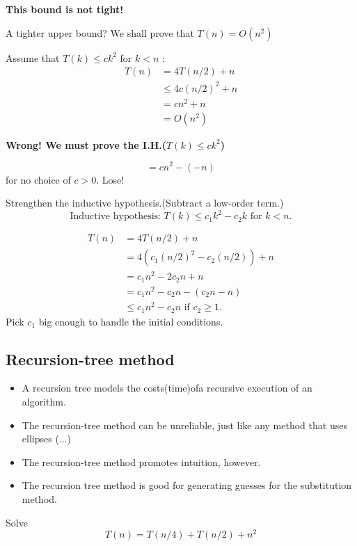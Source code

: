\documentclass[11pt]{elegantbook}
\begin{document}
\begin{center}
\textbf{This bound is not tight!}
\end{center}
\begin{note}
  A tighter upper bound? We shall prove that $T(n)=O\left(n^{2}\right)$
\end{note}
Assume that $T(k) \leq c k^{2}$ for $k<n$ :
$$
\begin{aligned}
T(n) &=4 T(n / 2)+n \\
& \leq 4 c(n / 2)^{2}+n \\
&=c n^{2}+n \\
&=O\left(n^{2}\right)
\end{aligned}
$$
\begin{center}
  \textbf{Wrong! We must prove the I.H.($T(k) \leq ck^2$)}
\end{center}
$$
=c n^{2}-(-n)
$$
for no choice of $c>0$. Lose!
\begin{note}
   Strengthen the inductive hypothesis.(Subtract a low-order term.)
  $$
\text { Inductive hypothesis: } T(k) \leq c_{1} k^{2}-c_{2} k \text { for } k<n \text {. }
$$
\end{note}
\begin{solution}
  $$
  \begin{aligned}
  T(n) &=4 T(n / 2)+n \\
  &=4\left(c_{1}(n / 2)^{2}-c_{2}(n / 2)\right)+n \\
  &=c_{1} n^{2}-2 c_{2} n+n \\
  &=c_{1} n^{2}-c_{2} n-\left(c_{2} n-n\right) \\
  & \leq c_{1} n^{2}-c_{2} n \text { if } c_{2} \geq 1 .
  \end{aligned}
  $$
Pick $c_1$ big enough to handle the initial conditions.
\end{solution}
\subsection{Recursion-tree method}
\begin{itemize}
  \item A recursion tree models the costs(time)ofa recursive execution of an algorithm.

  \item The recursion-tree method can be unreliable, just like any method that uses ellipses (...) 
  
  \item The recursion-tree method promotes intuition, however.
  \item The recursion tree method is good for generating guesses for the substitution method.
\end{itemize}
\begin{example}
  Solve 
  $$
  T(n)=T(n / 4)+T(n / 2)+n^{2}
  $$
\end{example}
\end{document}
